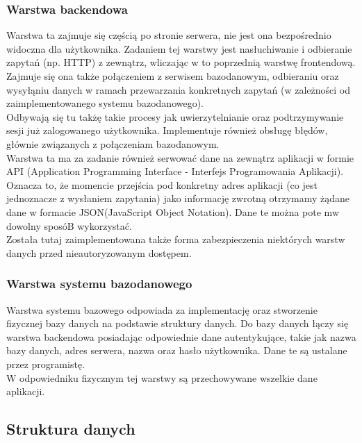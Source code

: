 \documentclass[eng,printmode]{mgr}
\begin{document}
\subsubsection{Warstwa backendowa}
Warstwa ta zajmuje się częścią po stronie serwera, nie jest ona bezpośrednio widoczna dla użytkownika. Zadaniem tej warstwy jest nasłuchiwanie i odbieranie zapytań (np. HTTP) z zewnątrz, wliczając w to poprzednią warstwę frontendową. Zajmuje się ona także połączeniem z serwisem bazodanowym, odbieraniu oraz wysyłąniu danych w ramach przewarzania konkretnych zapytań (w zależności od zaimplementowanego systemu bazodanowego).
\\
Odbywają się tu takżę takie procesy jak uwierzytelnianie oraz podtrzymywanie sesji już zalogowanego użytkownika. Implementuje również obsługę błędów, głównie związanych z połączeniam bazodanowym.
\\
Warstwa ta ma za zadanie również serwować dane na zewnątrz aplikacji w formie API (Application Programming Interface - Interfejs Programowania Aplikacji)\cite{API}. Oznacza to, że momencie przejścia pod konkretny adres aplikacji (co jest jednoznacze z wysłaniem zapytania) jako informację zwrotną otrzymamy żądane dane w formacie JSON(JavaScript Object Notation)\cite {JSON}. Dane te można pote mw dowolny sposóB wykorzystać.
\\
Została tutaj zaimplementowana także forma zabezpieczenia niektórych warstw danych przed nieautoryzowanym dostępem.
\subsubsection{Warstwa systemu bazodanowego}
Warstwa systemu bazowego odpowiada za implementację oraz stworzenie fizycznej bazy danych na podstawie struktury danych. Do bazy danych łączy się warstwa backendowa posiadając odpowiednie dane autentykujące, takie jak nazwa bazy danych, adres serwera, nazwa oraz hasło użytkownika. Dane te są ustalane przez programistę.
\\
W odpowiedniku fizycznym tej warstwy są przechowywane wszelkie dane aplikacji.

\subsection{Struktura danych}
\end{document}

